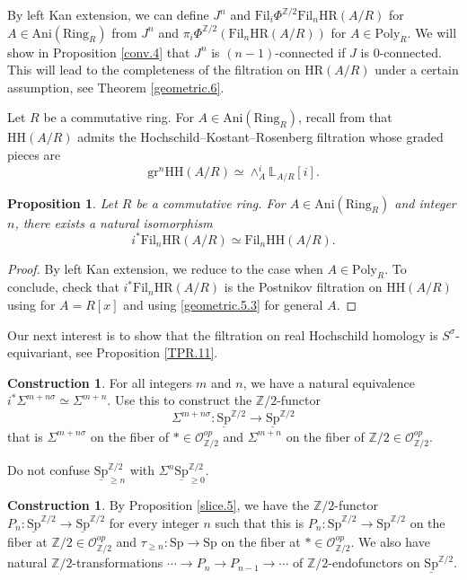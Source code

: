 \documentclass[10pt]{amsart}
\newtheorem{prop}[thm]{Proposition}
\theoremstyle{definition}
\newtheorem{const}[thm]{Construction}
\numberwithin{equation}{section}
\renewcommand{\L}{\mathbb{L}}
\newcommand{\Z}{\mathbb{Z}}
\newcommand{\cO}{\mathcal{O}}
\newcommand{\ul}{\underline}
\newcommand{\Ani}{\mathrm{Ani}}
\newcommand{\Ring}{\mathrm{Ring}}
\newcommand{\Sp}{\mathrm{Sp}}
\newcommand{\Poly}{\mathrm{Poly}}
\newcommand{\gr}{\mathrm{gr}}
\newcommand{\Fil}{\mathrm{Fil}}
\newcommand{\HH}{\mathrm{HH}}
\newcommand{\HR}{\mathrm{HR}}
\begin{document}
{By left Kan extension,
we can define $J^n$ and $\Fil_i \Phi^{\Z/2}\Fil_n\HR(A/R)$ for $A\in \Ani(\Ring_R)$ from $J^n$ and $\pi_i \Phi^{\Z/2}(\Fil_n \HR(A/R))$ for $A\in \Poly_R$.
We will show in Proposition \ref{conv.4} that $J^n$ is $(n-1)$-connected if $J$ is $0$-connected.
This will lead to the completeness of the filtration on $\HR(A/R)$ under a certain assumption,
see Theorem \ref{geometric.6}.

Let $R$ be a commutative ring.
For $A\in \Ani(\Ring_R)$,
recall from \cite[\S 2]{BMS19} that $\HH(A/R)$ admits the Hochschild--Kostant--Rosenberg filtration whose graded pieces are
\[
\gr^n \HH(A/R)
\simeq
\wedge_A^i \L_{A/R}[i].
\]

\begin{prop}
\label{geometric.8}
Let $R$ be a commutative ring.
For $A\in \Ani(\Ring_R)$ and integer $n$,
there exists a natural isomorphism
\[
i^*\Fil_n \HR(A/R)
\simeq
\Fil_n \HH(A/R).
\]
\end{prop}
\begin{proof}
By left Kan extension,
we reduce to the case when $A\in \Poly_R$.
To conclude,
check that $i^*\Fil_n \HR(A/R)$ is the Postnikov filtration on $\HH(A/R)$ using \cite[Lemma 4.28]{HP} for $A=R[x]$ and using \eqref{geometric.5.3} for general $A$.
\end{proof}

Our next interest is to show that the filtration on real Hochschild homology is $S^\sigma$-equivariant,
see Proposition \ref{TPR.11}.


\begin{const}
\label{TPR.3}
For all integers $m$ and $n$,
we have a natural equivalence $i^* \Sigma^{m+n\sigma}\simeq \Sigma^{m+n}$.
Use this to construct the $\Z/2$-functor
\[
\Sigma^{m+n\sigma}
\colon
\ul{\Sp}^{\Z/2}
\to
\ul{\Sp}^{\Z/2}
\]
that is $\Sigma^{m+n\sigma}$ on the fiber of $*\in \cO_{\Z/2}^{op}$ and $\Sigma^{m+n}$ on the fiber of $\Z/2\in \cO_{\Z/2}^{op}$.
\end{const}






Do not confuse $\ul{\Sp}_{\geq n}^{\Z/2}$ with $\Sigma^n \ul{\Sp}_{\geq 0}^{\Z/2}$.

\begin{const}
\label{TPR.10}
By Proposition \ref{slice.5},
we have the $\Z/2$-functor $P_n\colon \ul{\Sp}^{\Z/2}\to \ul{\Sp}^{\Z/2}$ for every integer $n$ such that this is $P_n\colon \Sp^{\Z/2}\to \Sp^{\Z/2}$ on the fiber at $\Z/2\in \cO_{\Z/2}^{op}$ and $\tau_{\geq n}\colon \Sp\to \Sp$ on the fiber at $*\in \cO_{\Z/2}^{op}$.
We also have natural $\Z/2$-transformations
\(
\cdots \to P_n\to P_{n-1}\to \cdots
\)
of $\Z/2$-endofunctors on $\ul{\Sp}^{\Z/2}$.


\end{const}}
\end{document}
